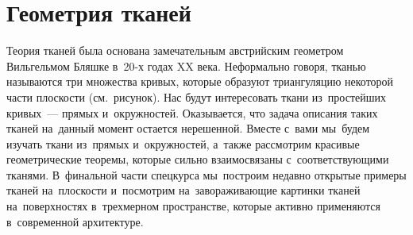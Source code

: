 
\section*{Геометрия тканей}



\begin{minipage}{0.70\textwidth}%
Теория тканей была основана замечательным австрийским геометром Вильгельмом
Бляшке в~20-х годах XX века.
Неформально говоря, тканью называются три множества кривых, которые образуют
триангуляцию некоторой части плоскости (см.~рисунок).
Нас будут интересовать ткани из~простейших кривых~--- прямых и~окружностей.
Оказывается, что задача описания таких тканей на~данный момент остается
нерешенной.
Вместе с~вами мы~будем изучать ткани из~прямых и~окружностей, а~также
рассмотрим красивые геометрические теоремы, которые сильно взаимосвязаны
с~соответствующими тканями.
В~финальной части спецкурса мы~построим недавно открытые примеры тканей
на~плоскости и~посмотрим на~завораживающие картинки тканей на~поверхностях
в~трехмерном пространстве, которые активно применяются в~современной
архитектуре.
\end{minipage}%
\hspace{0.05\textwidth}%
\begin{minipage}{0.25\textwidth}
\\[1em]
\end{minipage}

